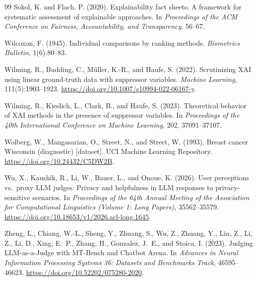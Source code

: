 \documentclass[fleqn,10pt,lineno]{wlpeerj}
\begin{document}
\begin{thebibliography}{99}
Sokol, K. and Flach, P. (2020).
Explainability fact sheets: A framework for systematic assessment of
explainable approaches.
In \emph{Proceedings of the ACM Conference on Fairness, Accountability,
and Transparency}, 56--67.

Wilcoxon, F. (1945).
Individual comparisons by ranking methods.
\emph{Biometrics Bulletin}, 1(6):80--83.

Wilming, R., Budding, C., M\"{u}ller, K.-R., and Haufe, S. (2022).
Scrutinizing {XAI} using linear ground-truth data with suppressor variables.
\emph{Machine Learning}, 111(5):1903--1923.
\url{https://doi.org/10.1007/s10994-022-06167-y}.

Wilming, R., Kieslich, L., Clark, B., and Haufe, S. (2023).
Theoretical behavior of {XAI} methods in the presence of suppressor
variables.
In \emph{Proceedings of the 40th International Conference on Machine
Learning}, 202, 37091--37107.

Wolberg, W., Mangasarian, O., Street, N., and Street, W. (1993).
Breast cancer {Wisconsin} (diagnostic) [dataset].
UCI Machine Learning Repository.
\url{https://doi.org/10.24432/C5DW2B}.

Wu, X., Kaushik, R., Li, W., Bauer, L., and Onoue, K. (2026).
User perceptions vs.\ proxy LLM judges: Privacy and helpfulness in LLM
responses to privacy-sensitive scenarios.
In \emph{Proceedings of the 64th Annual Meeting of the Association for
Computational Linguistics (Volume 1: Long Papers)}, 35562--35579.
\url{https://doi.org/10.18653/v1/2026.acl-long.1645}.

Zheng, L., Chiang, W.-L., Sheng, Y., Zhuang, S., Wu, Z., Zhuang, Y.,
Lin, Z., Li, Z., Li, D., Xing, E.~P., Zhang, H., Gonzalez, J.~E., and
Stoica, I. (2023).
Judging LLM-as-a-Judge with MT-Bench and Chatbot Arena.
In \emph{Advances in Neural Information Processing Systems 36: Datasets
and Benchmarks Track}, 46595--46623.
\url{https://doi.org/10.52202/075280-2020}.


\end{thebibliography}
\end{document}
